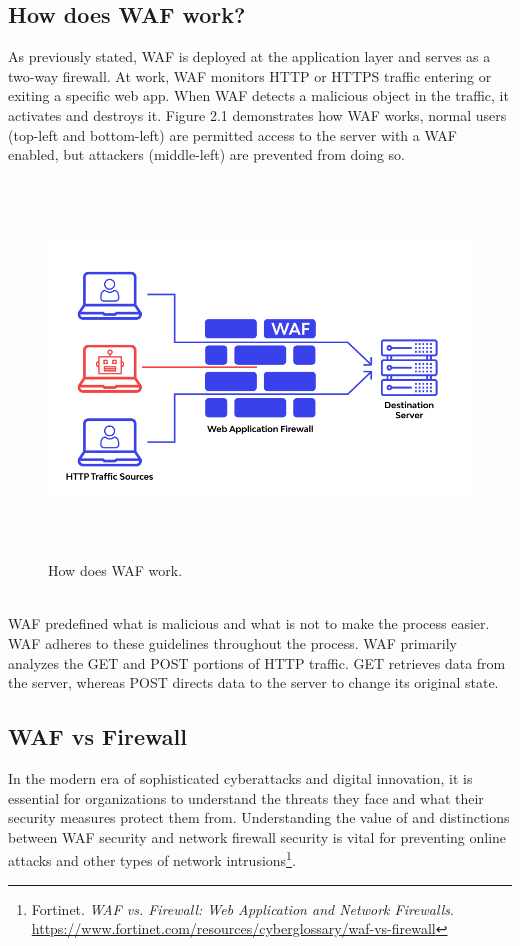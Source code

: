 \subsection{How does WAF work?}
\label{subsec:waf_work}
As previously stated, WAF is deployed at the application layer and serves as a two-way firewall. At work, WAF monitors HTTP or HTTPS traffic entering or exiting a specific web app. When WAF detects a malicious object in the traffic, it activates and destroys it. Figure 2.1 demonstrates how WAF works, normal users (top-left and bottom-left) are permitted access to the server with a WAF enabled, but attackers (middle-left) are prevented from doing so.
\begin{figure}[!h]
   
	\centering
	\includegraphics[width=\linewidth, height=10cm,keepaspectratio]{figures/wallarmwaf.png}
	\caption{How does WAF work.}\label{Fig:Data1}
  
\end{figure}
\\
WAF predefined what is malicious and what is not to make the process easier. WAF adheres to these guidelines throughout the process. WAF primarily analyzes the GET and POST portions of HTTP traffic. GET retrieves data from the server, whereas POST directs data to the server to change its original state.

\subsection{WAF vs Firewall}
\label{subsec:versus}
In the modern era of sophisticated cyberattacks and digital innovation, it is essential for organizations to understand the threats they face and what their security measures protect them from. Understanding the value of and distinctions between WAF security and network firewall security is vital for preventing online attacks and other types of network intrusions\footnote{Fortinet. \textit{WAF vs. Firewall: Web Application and Network Firewalls}. 
\url{https://www.fortinet.com/resources/cyberglossary/waf-vs-firewall}}.

